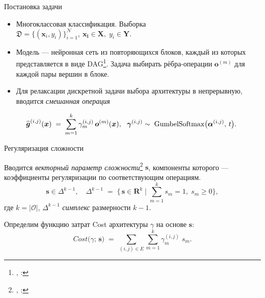 \documentclass{beamer}
\begin{document}
\begin{frame}{Постановка задачи} %
\begin{itemize}

    \item Многоклассовая классификация. Выборка $
    \mathfrak D = \{(\boldsymbol{x}_i, y_i)\}_{i=1}^{\mathcal N},
    \ \boldsymbol{x_i} \in \mathbf X,\; y_i \in \mathbf Y. $

    \vspace{10pt}
    
    \item Модель --- нейронная сеть из повторяющихся блоков, каждый из которых представляется в виде DAG\footnote{\citeauthor{liu2019darts}, \citeyear{liu2019darts}: }. Задача выбирать рёбра-операции $\boldsymbol{o}^{(m)}$ для каждой пары вершин в блоке. 
    
    \vspace{10pt}
    
    \item Для релаксации дискретной задачи выбора архитектуры в непрерывную, вводится \textit{смешанная операция}
    
    $$\hspace{-20pt}
    \widehat{\boldsymbol{g}}^{(i,j)}(\boldsymbol x) 
    \;=\; 
    \sum_{m=1}^k 
    \gamma^{(i,j)}_m \,\boldsymbol{o}^{(m)}(\boldsymbol x),
\ \ 
    \boldsymbol{\gamma}^{(i,j)}  \sim\; 
    \mathrm{GumbelSoftmax}\bigl(\boldsymbol{\alpha}^{(i,j)},\,t\bigr).
$$
\end{itemize}


    
\end{frame}



\begin{frame}{Регуляризация сложности}


Вводится \textit{векторный параметр сложности}\footnote{\citeauthor{yakovlev2021neural}, \citeyear{yakovlev2021neural}: } $\boldsymbol{s}$, компоненты которого --- коэффициенты регуляризации по соответствующим операциям.
$$\boldsymbol{s} \in \Delta^{k-1}, \quad
\Delta^{k-1} \;=\; \bigl\{\,\boldsymbol{s}\in \boldsymbol R^k\mid \sum_{m=1}^k s_m = 1,\; s_m\ge0 \bigr\},$$
где $k = |\mathcal O|$,  $ \Delta^{k-1}$ \textit{симплекс} размерности $k-1$.

\vspace{10pt}

Определим функцию затрат Cost архитектуры $\gamma$ на основе $\boldsymbol{s}$:
$$Cost\bigl(\gamma;\,\boldsymbol{s}\bigr)
    \;=\; 
    \sum_{(i,j)\in E} \sum_{m=1}^k 
    \gamma^{(i,j)}_m \;s_m.$$

\end{frame}
\end{document}
